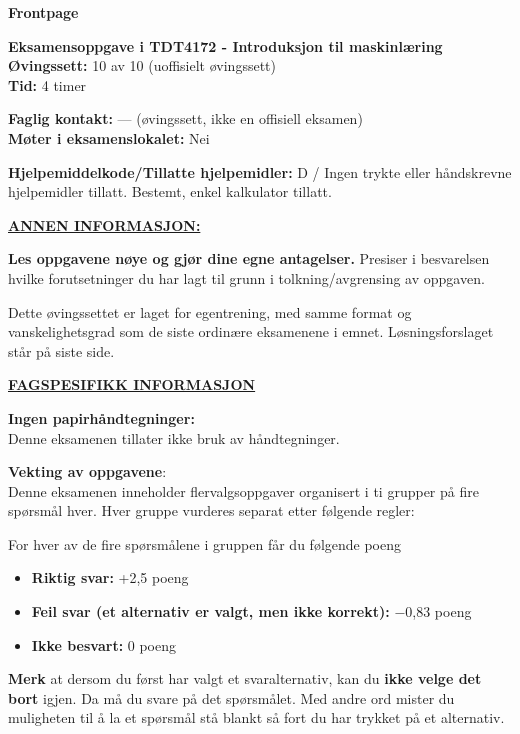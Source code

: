 \documentclass[11pt,a4paper]{article}
\begin{document}
\noindent\hspace*{-1.55em}%
{\sffamily\bfseries\fontsize{18}{22}\selectfont Frontpage}\par\vspace{1.1em}

{\bfseries Eksamensoppgave i TDT4172 - Introduksjon til maskinlæring}\\
{\bfseries Øvingssett:} 10 av 10 (uoffisielt øvingssett)\\
{\bfseries Tid:} 4 timer

\vspace{0.6em}
{\bfseries Faglig kontakt:} --- (øvingssett, ikke en offisiell eksamen)\\
{\bfseries Møter i eksamenslokalet:} Nei

\vspace{0.6em}
{\bfseries Hjelpemiddelkode/Tillatte hjelpemidler:} D / Ingen trykte eller håndskrevne hjelpemidler tillatt.
Bestemt, enkel kalkulator tillatt.

\vspace{0.6em}
{\bfseries\underline{ANNEN INFORMASJON:}}

\vspace{0.4em}
{\bfseries Les oppgavene nøye og gjør dine egne antagelser.} Presiser i besvarelsen hvilke forutsetninger du
har lagt til grunn i tolkning/avgrensing av oppgaven.

Dette øvingssettet er laget for egentrening, med samme format og vanskelighetsgrad som de
siste ordinære eksamenene i emnet. Løsningsforslaget står på siste side.

\vspace{1.6em}
{\bfseries\underline{FAGSPESIFIKK INFORMASJON}}

\vspace{0.4em}
{\bfseries Ingen papirhåndtegninger:}\\
Denne eksamenen tillater ikke bruk av håndtegninger.

\vspace{1.4em}
{\bfseries Vekting av oppgavene}:\\
Denne eksamenen inneholder flervalgsoppgaver organisert i ti grupper på fire spørsmål hver. Hver
gruppe vurderes separat etter følgende regler:

\vspace{0.6em}
For hver av de fire spørsmålene i gruppen får du følgende poeng
\begin{itemize}[leftmargin=2.2em,label=\textperiodcentered,itemsep=0pt]
\item {\bfseries Riktig svar:} +2,5 poeng
\item {\bfseries Feil svar (et alternativ er valgt, men ikke korrekt):} $-$0,83 poeng
\item {\bfseries Ikke besvart:} 0 poeng
\end{itemize}
{\bfseries Merk} at dersom du først har valgt et svaralternativ, kan du {\bfseries ikke velge det bort} igjen. Da må du
svare på det spørsmålet. Med andre ord mister du muligheten til å la et spørsmål stå blankt så fort
du har trykket på et alternativ.
\end{document}
